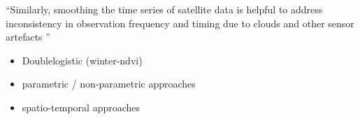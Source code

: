 


``Similarly, smoothing the time series of satellite data is helpful to address inconsistency in observation frequency and timing due to clouds and other sensor artefacts \cite{skakunWinterWheatYield2019}''



\begin{itemize}
    \item Doublelogistic (winter-ndvi)
    \item parametric / non-parametric approaches
    \item spatio-temporal approaches
\end{itemize}









